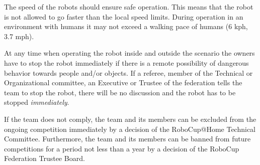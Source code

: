 The speed of the robots should ensure safe operation. This means that the robot is not allowed to go faster than the local speed limits. During operation in an environment with humans it may not exceed a walking pace of humans (6 kph, 3.7 mph). 

At any time when operating the robot inside and outside the scenario the owners have to stop the robot immediately if there is a remote possibility of dangerous behavior towards people and/or objects. If a referee, member of the Technical or Organizational committee, an Executive or Trustee of the federation tells the team to stop the robot, there will be no discussion and the robot has to be stopped \emph{immediately}.

If the team does not comply, the team and its members can be excluded from the ongoing competition immediately by a decision of the RoboCup@Home Technical Committee. Furthermore, the team and its members can be banned from future competitions for a period not less than a year by a decision of the RoboCup Federation Trustee Board.%
